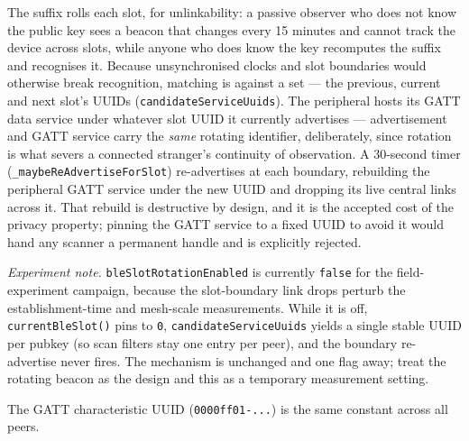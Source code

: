 \documentclass[11pt]{report}
\newcommand{\code}[1]{\texttt{\small #1}}
\begin{document}
The suffix rolls each slot, for unlinkability: a passive observer who does not know the public key sees a beacon that changes every 15 minutes and cannot track the device across slots, while anyone who does know the key recomputes the suffix and recognises it. Because unsynchronised clocks and slot boundaries would otherwise break recognition, matching is against a set --- the previous, current and next slot's UUIDs (\code{candidateServiceUuids}). The peripheral hosts its GATT data service under whatever slot UUID it currently advertises --- advertisement and GATT service carry the \emph{same} rotating identifier, deliberately, since rotation is what severs a connected stranger's continuity of observation. A 30-second timer (\code{\_maybeReAdvertiseForSlot}) re-advertises at each boundary, rebuilding the peripheral GATT service under the new UUID and dropping its live central links across it. That rebuild is destructive by design, and it is the accepted cost of the privacy property; pinning the GATT service to a fixed UUID to avoid it would hand any scanner a permanent handle and is explicitly rejected.

\emph{Experiment note.} \code{bleSlotRotationEnabled} is currently \code{false} for the field-experiment campaign, because the slot-boundary link drops perturb the establishment-time and mesh-scale measurements. While it is off, \code{currentBleSlot()} pins to \code{0}, \code{candidateServiceUuids} yields a single stable UUID per pubkey (so scan filters stay one entry per peer), and the boundary re-advertise never fires. The mechanism is unchanged and one flag away; treat the rotating beacon as the design and this as a temporary measurement setting.

The GATT characteristic UUID (\code{0000ff01-...}) is the same constant across all peers.
\end{document}
